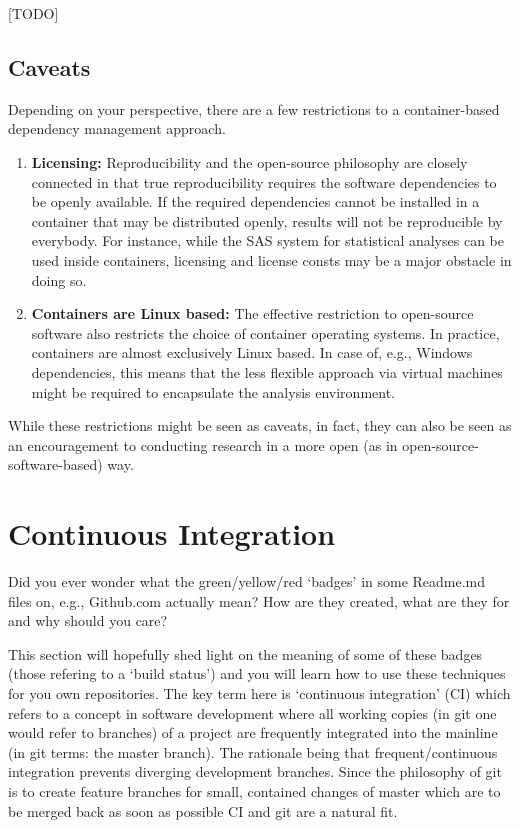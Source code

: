 \documentclass[]{book}
\providecommand{\tightlist}{%
  \setlength{\itemsep}{0pt}\setlength{\parskip}{0pt}}
\begin{document}
{[}TODO{]}

\section{Caveats}\label{caveats}

Depending on your perspective, there are a few restrictions to a
container-based dependency management approach.

\begin{enumerate}
\def\labelenumi{\arabic{enumi}.}
\tightlist
\item
  \textbf{Licensing:} Reproducibility and the open-source philosophy are
  closely connected in that true reproducibility requires the software
  dependencies to be openly available. If the required dependencies
  cannot be installed in a container that may be distributed openly,
  results will not be reproducible by everybody. For instance, while the
  SAS system for statistical analyses can be used inside containers,
  licensing and license consts may be a major obstacle in doing so.
\item
  \textbf{Containers are Linux based:} The effective restriction to
  open-source software also restricts the choice of container operating
  systems. In practice, containers are almost exclusively Linux based.
  In case of, e.g., Windows dependencies, this means that the less
  flexible approach via virtual machines might be required to
  encapsulate the analysis environment.
\end{enumerate}

While these restrictions might be seen as caveats, in fact, they can
also be seen as an encouragement to conducting research in a more open
(as in open-source-software-based) way.

\chapter{Continuous Integration}\label{chptr-continuous-integration}

Did you ever wonder what the green/yellow/red `badges' in some Readme.md
files on, e.g., Github.com actually mean? How are they created, what are
they for and why should you care?

This section will hopefully shed light on the meaning of some of these
badges (those refering to a `build status') and you will learn how to
use these techniques for you own repositories. The key term here is
`continuous integration' (CI) which refers to a concept in software
development where all working copies (in git one would refer to
branches) of a project are frequently integrated into the mainline (in
git terms: the master branch). The rationale being that
frequent/continuous integration prevents diverging development branches.
Since the philosophy of git is to create feature branches for small,
contained changes of master which are to be merged back as soon as
possible CI and git are a natural fit.
\end{document}
